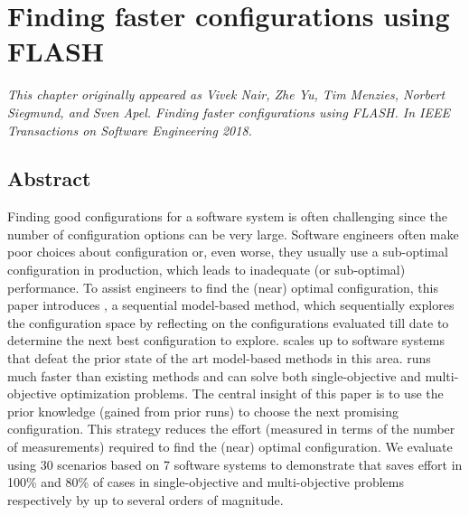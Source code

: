 \chapter{Finding faster configurations using FLASH}
\label{chapter:flash}


\noindent\textit{This chapter originally appeared as 
Vivek Nair, Zhe Yu, Tim Menzies, Norbert Siegmund, and Sven Apel. Finding faster configurations using FLASH. In IEEE Transactions on Software Engineering 2018.}

\section{Abstract}
Finding good configurations for a software system is often challenging since the number of configuration options can be very large.
Software engineers often make poor choices about configuration or, even worse, they usually use a sub-optimal configuration in production, which leads to inadequate (or sub-optimal) performance. To assist engineers to find the (near) optimal configuration, this paper introduces   \flash, a sequential model-based method, which sequentially explores the configuration space by reflecting on the configurations evaluated till date to determine the next best configuration to explore.
\flash scales up to software systems that defeat the prior state of the art model-based methods in this area. \flash runs much faster than existing methods and can solve both single-objective and multi-objective optimization problems. The central insight of this paper is to use the prior knowledge (gained from prior runs) to choose the next promising configuration. This strategy reduces the effort (measured in terms of the number of measurements) required to find the (near) optimal configuration. 
We evaluate \flash  using 30 scenarios based on 7 software systems to demonstrate that \flash saves effort in 100\% and 80\% of cases in single-objective and multi-objective problems respectively by up to several orders of magnitude. 

